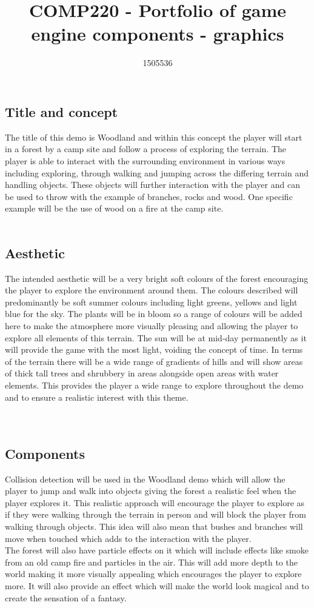 \documentclass{scrartcl}
\title{COMP220 - Portfolio of game engine components - graphics}
\author{1505536}
\begin{document}
\maketitle

\subsection{Title and concept }
The title of this demo is Woodland and within this concept the player will start in a forest by a camp site and follow a process of exploring the terrain. The player is able to interact with the surrounding environment in various ways including exploring, through walking and jumping across the differing terrain and handling objects. These objects will further interaction with the player and can be used to throw with the example of branches, rocks and wood. One specific example will be the use of wood on a fire at the camp site.
\\
\\
\subsection{Aesthetic}
The intended aesthetic will be a very bright soft colours of the forest encouraging the player to explore the environment around them. The colours described will predominantly be soft summer colours including light greens, yellows and light blue for the sky. The plants will be in bloom so a range of colours will be added here to make the atmosphere more visually pleasing and allowing the player to explore all elements of this terrain. The sun will be at mid-day permanently as it will provide the game with the most light, voiding the concept of time. In terms of the terrain there will be a wide range of gradients of hills and will show areas of thick tall trees and shrubbery in areas alongside open areas with water elements. This provides the player a wide range to explore throughout the demo and to ensure a realistic interest with this theme. 
\\
\\
\\
\subsection{Components}
Collision detection will be used in the Woodland demo which will allow the player to jump and walk into objects giving the forest a realistic feel when the player explores it. This realistic approach will encourage the player to explore as if they were walking through the terrain in person and will block the player from walking through objects. This idea will also mean that bushes and branches will move when touched which adds to the interaction with the player. 
\\
The forest will also have particle effects on it which will include effects like smoke from an old camp fire and particles in the air. This will add more depth to the world making it more visually appealing which encourages the player to explore more. It will also provide an effect which will make the world look magical and to create the sensation of a fantasy.
\end{document}
